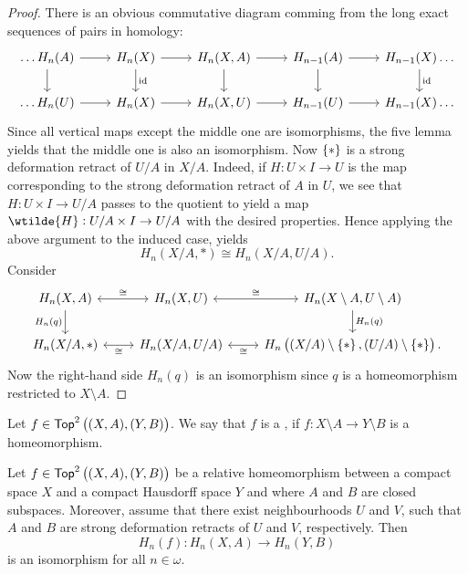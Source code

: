 \begin{proof}
	There is an obvious commutative diagram comming from the long exact sequences of pairs in homology:
	\begin{equation*}
		\begin{tikzcd}
			\dots H_n(A) \arrow[r]\arrow[d] & H_n(X) \arrow[r]\arrow[d,"\id"] & H_n(X,A) \arrow[r]\arrow[d] & H_{n - 1}(A) \arrow[r]\arrow[d] & H_{n - 1}(X)\arrow[d,"\id"]\dots\\
			\dots H_n(U) \arrow[r] & H_n(X) \arrow[r] & H_n(X,U) \arrow[r] & H_{n - 1}(U) \arrow[r] & H_{n - 1}(X)\dots
		\end{tikzcd}
	\end{equation*}
	Since all vertical maps except the middle one are isomorphisms, the five lemma yields that the middle one is also an isomorphism. Now $\cbr{\ast}$ is a strong deformation retract of $U/A$ in $X/A$. Indeed, if $H : U \times I \to U$ is the map corresponding to the strong deformation retract of $A$ in $U$, we see that $H : U \times I \to U/A$ passes to the quotient to yield a map $\wtilde{H} : U/A \times I \to U/A$ with the desired properties. Hence applying the above argument to the induced case, yields
	\begin{equation*}
		H_n(X/A,\ast) \cong H_n(X/A,U/A).
	\end{equation*}
	Consider
	\begin{equation*}
		\begin{tikzcd}
			H_n(X,A)\arrow[d,"H_n(q)"']\arrow[r,leftrightarrow,"\cong"] & H_n(X,U)\arrow[r,leftrightarrow,"\cong"] & H_n(X\setminus A,U \setminus A) \arrow[d,"H_n(q)"]\\
			H_n(X/A,\ast) \arrow[r,leftrightarrow,"\cong"'] & H_n(X/A,U/A)\arrow[r,leftrightarrow,"\cong"'] & H_n\del[1]{(X/A) \setminus \cbr{\ast},(U/A)\setminus \cbr{\ast}}.
		\end{tikzcd}
	\end{equation*}
	Now the right-hand side $H_n(q)$ is an isomorphism since $q$ is a homeomorphism restricted to $X\setminus A$.
\end{proof}

\begin{definition}
	Let $f \in \mathsf{Top}^2 \del[1]{(X,A),(Y,B)}$. We say that $f$ is a , if $f : X \setminus A \to Y \setminus B$ is a homeomorphism.
\end{definition}

\begin{theorem}
	Let $f \in \mathsf{Top}^2 \del[1]{(X,A),(Y,B)}$ be a relative homeomorphism between a compact space $X$ and a compact Hausdorff space $Y$ and where $A$ and $B$ are closed subspaces. Moreover, assume that there exist neighbourhoods $U$ and $V$, such that $A$ and $B$ are strong deformation retracts of $U$ and $V$, respectively. Then
	\begin{equation*}
		H_n(f) : H_n(X,A) \to H_n(Y,B)
	\end{equation*}
	\noindent is an isomorphism for all $n \in \omega$.
\end{theorem}

